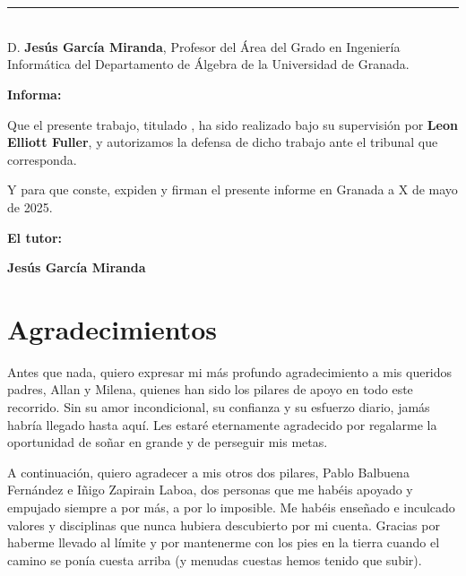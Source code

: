 \chapter*{}
\thispagestyle{empty}

\noindent\rule[-1ex]{\textwidth}{2pt}\\[4.5ex]

D. \textbf{Jesús García Miranda}, Profesor del Área del Grado en Ingeniería Informática  del Departamento de Álgebra de la Universidad de Granada.

\vspace{0.5cm}

\vspace{0.5cm}

\textbf{Informa:}

\vspace{0.5cm}

Que el presente trabajo, titulado \textit{\textbf{\myTitle}},
ha sido realizado bajo su supervisión por \textbf{Leon Elliott Fuller}, y autorizamos la defensa de dicho trabajo ante el tribunal
que corresponda.

\vspace{0.5cm}

Y para que conste, expiden y firman el presente informe en Granada a X de mayo de 2025.

\vspace{1cm}

\textbf{El tutor:}

\vspace{5cm}

\noindent \textbf{Jesús García Miranda}

\chapter*{Agradecimientos}
\thispagestyle{empty}

       \vspace{1cm}


Antes que nada, quiero expresar mi más profundo agradecimiento a mis queridos padres, Allan y Milena, quienes han sido los pilares de apoyo en todo este recorrido. Sin su amor incondicional, su confianza y su esfuerzo diario, jamás habría llegado hasta aquí. Les estaré eternamente agradecido por regalarme la oportunidad de soñar en grande y de perseguir mis metas.

A continuación, quiero agradecer a mis otros dos pilares, Pablo Balbuena Fernández e Iñigo Zapirain Laboa, dos personas que me habéis apoyado y empujado siempre a por más, a por lo imposible. Me habéis enseñado e inculcado valores y disciplinas que nunca hubiera descubierto por mi cuenta. Gracias por haberme llevado al límite y por mantenerme con los pies en la tierra cuando el camino se ponía cuesta arriba (y menudas cuestas hemos tenido que subir).


